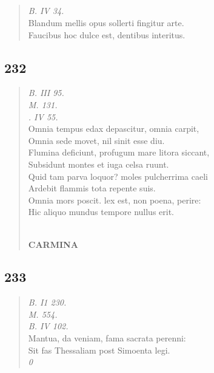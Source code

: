 \documentclass[11pt, a4paper]{report}
\begin{document}
            \subsection*{}
      \begin{verse}
      \textit{B. IV 34.} \\ Blandum mellis opus sollerti fingitur arte. \\ Faucibus hoc dulce est, dentibus interitus. \\ 
      \end{verse}
  
            \subsection*{232}
      \begin{verse}
      \textit{B. III 95.} \\ \textit{M. 131.} \\ \textit{. IV 55.} \\ Omnia tempus edax depascitur, omnia carpit, \\ Omnia sede movet, nil sinit esse diu. \\ Flumina deficiunt, profugum mare litora siccant, \\ Subsidunt montes et iuga celsa ruunt. \\ Quid tam parva loquor? moles pulcherrima caeli \\ Ardebit flammis tota repente suis. \\ Omnia mors poscit. lex est, non poena, perire: \\ Hic aliquo mundus tempore nullus erit. \\ 
        ﻿\pagebreak 
     \marginpar{[192]} \begin{center} \textbf{CARMINA} \end{center}
      \end{verse}
  
            \subsection*{233}
      \begin{verse}
      \textit{B. I1 230.} \\ \textit{M. 554.} \\ \textit{B. IV 102.} \\ Mantua, da veniam, fama sacrata perenni: \\ Sit fas Thessaliam post Simoenta legi. \\ \textit{0} \\ 
      \end{verse}
  
\end{document}
